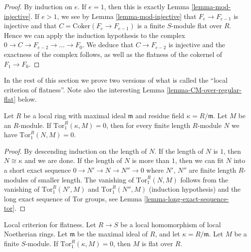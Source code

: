 \begin{proof}
By induction on $e$. If $e = 1$, then this is exactly
Lemma \ref{lemma-mod-injective}. If $e > 1$, we see
by Lemma \ref{lemma-mod-injective} that $F_e \to F_{e-1}$
is injective and that $C = \text{Coker}(F_e \to F_{e-1})$
is a finite $S$-module flat over $R$. Hence we can 
apply the induction hypothesis to the complex
$0 \to C \to F_{e-2} \to \ldots \to F_0$.
We deduce that $C \to F_{e-2}$ is injective
and the exactness of the complex follows, as well
as the flatness of the cokernel of $F_1 \to F_0$.
\end{proof}

\noindent
In the rest of this section we prove two versions of what is called the
``local criterion of flatness''. Note also the interesting
Lemma \ref{lemma-CM-over-regular-flat} below.

\begin{lemma}
\label{lemma-prepare-local-criterion-flatness}
Let $R$ be a local ring with maximal ideal $\mathfrak m$
and residue field $\kappa = R/\mathfrak m$.
Let $M$ be an $R$-module. If $\text{Tor}_1^R(\kappa, M) = 0$,
then for every finite length $R$-module $N$ we have
$\text{Tor}_1^R(N, M) = 0$.
\end{lemma}

\begin{proof}
By descending induction on the length of $N$.
If the length of $N$ is $1$, then $N \cong \kappa$
and we are done. If the length of $N$ is more than
$1$, then we can fit $N$ into a short exact sequence
$0 \to N' \to N \to N'' \to 0$ where $N'$, $N''$ are
finite length $R$-modules of smaller length.
The vanishing of $\text{Tor}_1^R(N, M)$ follows
from the vanishing of $\text{Tor}_1^R(N', M)$
and $\text{Tor}_1^R(N'', M)$ (induction hypothesis)
and the long exact sequence of Tor groups, see Lemma
\ref{lemma-long-exact-sequence-tor}.
\end{proof}

\begin{lemma}
\label{lemma-local-criterion-flatness}
Local criterion for flatness.
Let $R \to S$ be a local homomorphism of local Noetherian
rings. Let $\mathfrak m$ be the maximal ideal of $R$,
and let $\kappa = R/\mathfrak m$.
Let $M$ be a finite $S$-module. If $\text{Tor}_1^R(\kappa, M) = 0$,
then $M$ is flat over $R$.
\end{lemma}

